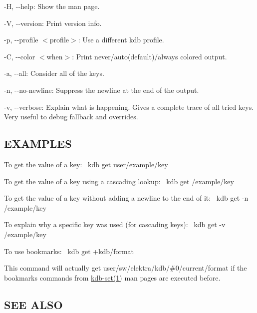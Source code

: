 \begin{DoxyItemize}
\item {\ttfamily -\/H}, {\ttfamily -\/-\/help}\+: Show the man page.
\item {\ttfamily -\/V}, {\ttfamily -\/-\/version}\+: Print version info.
\item {\ttfamily -\/p}, {\ttfamily -\/-\/profile $<$profile$>$}\+: Use a different kdb profile.
\item {\ttfamily -\/C}, {\ttfamily -\/-\/color $<$when$>$}\+: Print never/auto(default)/always colored output.
\item {\ttfamily -\/a}, {\ttfamily -\/-\/all}\+: Consider all of the keys.
\item {\ttfamily -\/n}, {\ttfamily -\/-\/no-\/newline}\+: Suppress the newline at the end of the output.
\item {\ttfamily -\/v}, {\ttfamily -\/-\/verbose}\+: Explain what is happening. Gives a complete trace of all tried keys. Very useful to debug fallback and overrides.
\end{DoxyItemize}

\subsection*{E\+X\+A\+M\+P\+L\+ES}

To get the value of a key\+:~\newline
 {\ttfamily kdb get user/example/key}

To get the value of a key using a cascading lookup\+:~\newline
 {\ttfamily kdb get /example/key}

To get the value of a key without adding a newline to the end of it\+:~\newline
 {\ttfamily kdb get -\/n /example/key}

To explain why a specific key was used (for cascading keys)\+:~\newline
 {\ttfamily kdb get -\/v /example/key}

To use bookmarks\+:~\newline
 {\ttfamily kdb get +kdb/format}

This command will actually get {\ttfamily user/sw/elektra/kdb/\#0/current/format} if the bookmarks commands from \hyperlink{md_doc_help_kdb-set_doc_help_kdb-set_md}{kdb-\/set(1)} man pages are executed before.

\subsection*{S\+EE A\+L\+SO}


